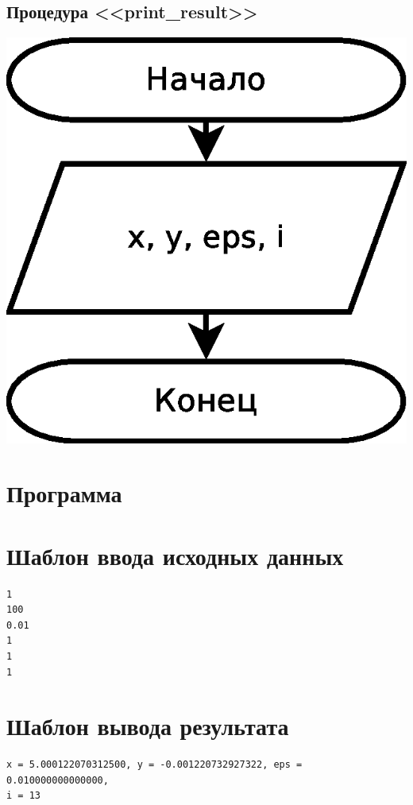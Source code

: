 \documentclass[a4paper]{article}
\begin{document}
\subsection{Процедура <<print\_result>>}
\includegraphics[scale=0.5]{schemes/print_result}

\section{Программа}


\section{Шаблон ввода исходных данных}
\begin{verbatim}
1
100
0.01
1
1
1
\end{verbatim}

\section{Шаблон вывода результата}
\begin{verbatim}
x = 5.000122070312500, y = -0.001220732927322, eps = 0.010000000000000,
i = 13

\end{verbatim}
\end{document}

